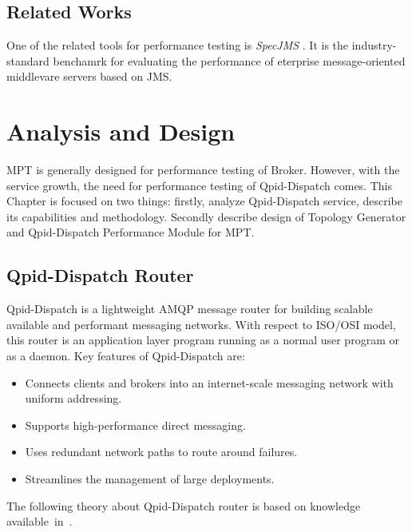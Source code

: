 
\section{Related Works}
\label{Related Works}

One of the related tools for performance testing is \emph{SpecJMS} \cite{SPECJMS}. It is the industry-standard benchamrk for evaluating the performance of eterprise message-oriented middlevare servers based on JMS.


\chapter{Analysis and Design}
\label{Analysis and Design}
MPT is generally designed for performance testing of Broker. However, with the service growth, the need for performance testing of Qpid-Dispatch comes. This Chapter is focused on two things: firstly, analyze Qpid-Dispatch service, describe its capabilities and methodology. Secondly describe design of Topology Generator and Qpid-Dispatch Performance Module for MPT.

\section{Qpid-Dispatch Router}
Qpid-Dispatch is a lightweight AMQP message router for building scalable available and performant messaging networks. With respect to ISO/OSI\footnotemark{} model, this router is an application layer program running as a normal user program or as a daemon. Key features of Qpid-Dispatch are:

\begin{itemize}
	\setlength\itemsep{0em}
	\item Connects clients and brokers into an internet-scale messaging network with uniform addressing.
	\item Supports high-performance direct messaging.
	\item Uses redundant network paths to route around failures.
	\item Streamlines the management of large deployments.
\end{itemize}
The following theory about Qpid-Dispatch router is based on knowledge available~in~\cite{RH:Interconnect}.


